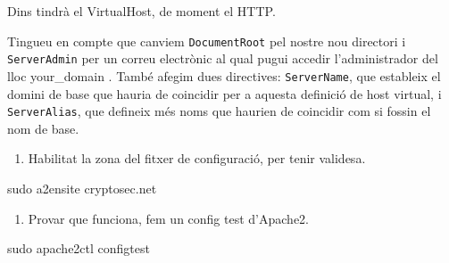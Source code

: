 \documentclass[]{article}
\newenvironment{Shaded}{}{}
\newcommand{\ExtensionTok}[1]{#1}
\newcommand{\FunctionTok}[1]{\textcolor[rgb]{0.02,0.16,0.49}{#1}}
\newcommand{\NormalTok}[1]{#1}
\newcommand{\OperatorTok}[1]{\textcolor[rgb]{0.40,0.40,0.40}{#1}}
\newcommand{\VariableTok}[1]{\textcolor[rgb]{0.10,0.09,0.49}{#1}}
\providecommand{\tightlist}{%
  \setlength{\itemsep}{0pt}\setlength{\parskip}{0pt}}
\begin{document}
Dins tindrà el VirtualHost, de moment el HTTP.

\begin{Shaded}
\end{Shaded}

Tingueu en compte que canviem \texttt{DocumentRoot} pel nostre nou
directori i \texttt{ServerAdmin} per un correu electrònic al qual pugui
accedir l'administrador del lloc your\_domain . També afegim dues
directives: \texttt{ServerName}, que estableix el domini de base que
hauria de coincidir per a aquesta definició de host virtual, i
\texttt{ServerAlias}, que defineix més noms que haurien de coincidir com
si fossin el nom de base.

\begin{enumerate}
\def\labelenumi{\arabic{enumi}.}
\setcounter{enumi}{6}
\tightlist
\item
  Habilitat la zona del fitxer de configuració, per tenir validesa.
\end{enumerate}

\begin{Shaded}
\begin{Highlighting}[]
\FunctionTok{sudo}\NormalTok{ a2ensite cryptosec.net}
\end{Highlighting}
\end{Shaded}

\begin{enumerate}
\def\labelenumi{\arabic{enumi}.}
\setcounter{enumi}{7}
\tightlist
\item
  Provar que funciona, fem un config test d'Apache2.
\end{enumerate}

\begin{Shaded}
\begin{Highlighting}[]
\FunctionTok{sudo}\NormalTok{ apache2ctl configtest}
\end{Highlighting}
\end{Shaded}
\end{document}
